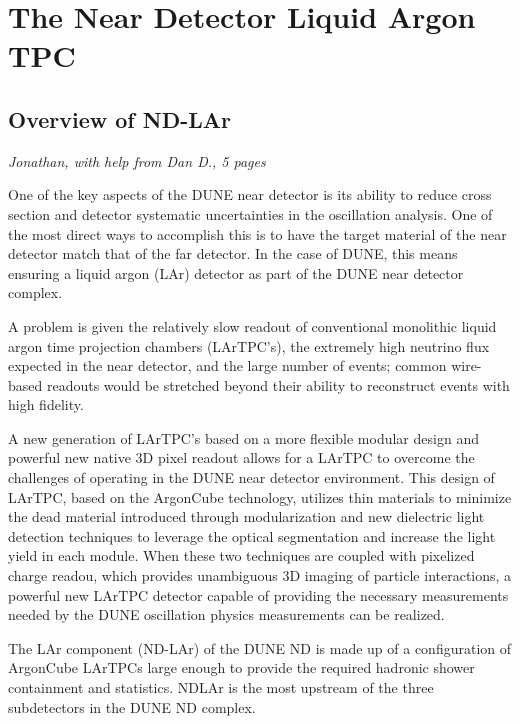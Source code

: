 \chapter{The Near Detector Liquid Argon TPC}
\label{ch:lartpc}

\section{Overview of ND-LAr}
\label{sec:lartpc-ovvw}
{\it Jonathan, with help from Dan D., 5 pages}

One of the key aspects of the DUNE near detector is its ability to reduce cross section and detector systematic uncertainties in the oscillation analysis. One of the most direct ways to accomplish this is to have the target material of the near detector match that of the far detector. In the case of DUNE, this means ensuring a liquid argon (LAr) detector as part of the DUNE near detector complex. 

A problem is given the relatively slow readout of conventional monolithic liquid argon time projection chambers (LArTPC's), the extremely high neutrino flux expected in the near detector, and the large number of events; common wire-based readouts would be stretched beyond their ability to reconstruct events with high fidelity. 

A new generation of LArTPC's based on a more flexible modular design and powerful new native 3D pixel readout allows for a LArTPC to overcome the challenges of operating in the DUNE near detector environment. This design of LArTPC, based on the ArgonCube technology, utilizes thin materials to minimize the dead material introduced through modularization and new dielectric light detection techniques to leverage the optical segmentation and increase the light yield in each module. When these two techniques are coupled with pixelized charge readou, which provides unambiguous
3D imaging of particle interactions, a powerful new LArTPC detector capable of providing the necessary measurements needed by the DUNE oscillation physics measurements can be realized.

The LAr component (ND-LAr) of the DUNE ND is made up of a configuration of ArgonCube LArTPCs large enough to provide the required hadronic shower containment and statistics. NDLAr is the most upstream of the three subdetectors in the DUNE ND complex.

